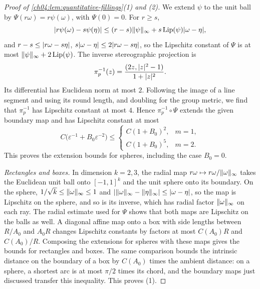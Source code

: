 \begin{proof}[Proof of \cref{ch04:lem:quantitative-fillings}(1) and (2)]
We extend $\psi$ to the unit ball by $\Psi(r\omega)=r\psi(\omega)$, with $\Psi(0)=0$. For $r\ge s$,
\[
 \lvert r\psi(\omega)-s\psi(\eta)\rvert\le(r-s)\lVert \psi\rVert_\infty+s\operatorname{Lip}(\psi)\lvert \omega-\eta\rvert,
\]
and $r-s\le\lvert r\omega-s\eta\rvert$, $s\lvert \omega-\eta\rvert\le2\lvert r\omega-s\eta\rvert$, so the Lipschitz constant of $\Psi$ is at most $\lVert \psi\rVert_\infty+2\operatorname{Lip}(\psi)$. The inverse stereographic projection is
\[
 \pi_p^{-1}(z)=\frac{(2z,\lvert z\rvert^2-1)}{1+\lvert z\rvert^2}.
\]
Its differential has Euclidean norm at most $2$. Following the image of a line segment and using its round length, and doubling for the group metric, we find that $\pi_p^{-1}$ has Lipschitz constant at most $4$. Hence $\pi_p^{-1}\circ\Psi$ extends the given boundary map and has Lipschitz constant at most
\[
 C\bigl(\varepsilon^{-1}+B_0\varepsilon^{-2}\bigr)\le\begin{cases}C(1+B_0)^2,&m=1,\\ C(1+B_0)^5,&m=2.\end{cases}
\]
This proves the extension bounds for spheres, including the case $B_0=0$.

\emph{Rectangles and boxes.} In dimension $k=2,3$, the radial map $r\omega\mapsto r\omega/\lVert \omega\rVert_\infty$ takes the Euclidean unit ball onto $[-1,1]^k$ and the unit sphere onto its boundary. On the sphere, $1/\sqrt k\le\lVert \omega\rVert_\infty\le1$ and $\lvert \lVert \omega\rVert_\infty-\lVert \eta\rVert_\infty\rvert\le\lvert \omega-\eta\rvert$, so the map is Lipschitz on the sphere, and so is its inverse, which has radial factor $\lVert \omega\rVert_\infty$ on each ray. The radial estimate used for $\Psi$ shows that both maps are Lipschitz on the balls as well. A diagonal affine map onto a box with side lengths between $R/A_0$ and $A_0R$ changes Lipschitz constants by factors at most $C(A_0)R$ and $C(A_0)/R$. Composing the extensions for spheres with these maps gives the bounds for rectangles and boxes. The same comparison bounds the intrinsic distance on the boundary of a box by $C(A_0)$ times the ambient distance: on a sphere, a shortest arc is at most $\pi/2$ times its chord, and the boundary maps just discussed transfer this inequality. This proves (1).


\end{proof}
